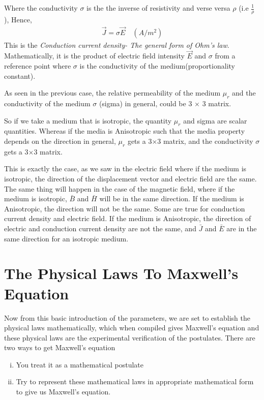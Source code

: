 Where the conductivity $ \sigma $ is the the inverse of resistivity and verse versa $ \rho $ (i.e $ \frac{1}{\rho} $ ), Hence, 
\begin{align}
\boxed{\vec{J} = \sigma \vec{E}}\quad (A/m^{2})
\end{align}
This is the \emph{Conduction current density- The general form of Ohm's law}. Mathematically, it is the product of electric field intensity $\vec{E}$ and $\sigma$ from a reference point where $\sigma$ is the conductivity of the medium(proportionality constant).

As seen in the previous case, the relative permeability of the medium $ \mu_r $ and the conductivity of the medium $ \sigma $ (sigma) in general, could be 3 $ \times $ 3 matrix.

So if we take a medium that is isotropic, the quantity $ \mu_r$ and sigma are scalar quantities. Whereas if the media is Anisotropic such that the media property depends on the direction in general, $ \mu_r $ gets a 3$ \times $3 matrix, and the conductivity $ \sigma $ gets a 3$ \times $3 matrix.

This is exactly the case, as we saw in the electric field where if the medium is isotropic, the direction of the displacement vector and electric field are the same. The same thing will happen in the case of the magnetic field, where if the medium is isotropic, $ \bar{B}$ and $ \bar{H}$ will be in the same direction. If the medium is Anisotropic, the direction will not be the same. Some are true for conduction current density and electric field. If the medium is Anisotropic, the direction of electric and conduction current density are not the same, and $ \bar{J} $ and $\bar{E}$ are in the same direction for an isotropic medium. 

\section{The Physical Laws To Maxwell's Equation}
Now from this basic introduction of the parameters, we are set to establish the physical laws mathematically, which when compiled gives Maxwell's equation and these physical laws are the experimental verification of the postulates. There are two ways to get Maxwell's equation
\begin{enumerate}[(i)]
\item You treat it as a mathematical postulate
\item Try to represent these mathematical laws in appropriate mathematical form to give us Maxwell's equation.
\end{enumerate}


